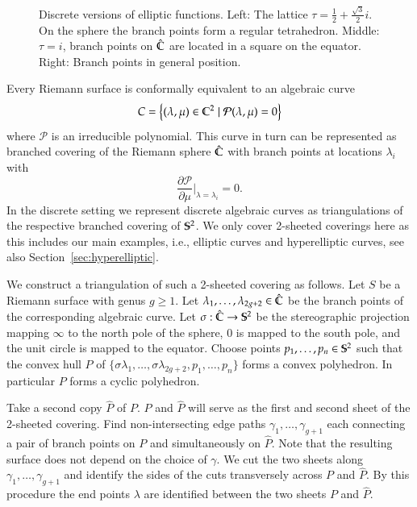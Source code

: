 \documentclass[Thesis]{subfiles}
\begin{document}
\begin{figure}
\centering
{}
\caption{Discrete versions of elliptic functions. Left: The lattice $\tau=\frac{1}{2}+\frac{\sqrt 3}{2}i$. On the sphere the branch points form a regular tetrahedron. Middle: $\tau=i$, branch points on $\hat \C$ are located in a square on the equator. Right: Branch points in general position.}
\label{fig:p_functions}
\end{figure}

Every Riemann surface is conformally equivalent to an algebraic curve
\[C=\left\{(\lambda,\mu)\in \C^2 \mid \mathcal P(\lambda,\mu)=0\right\}\]
where $\mathcal P$ is an irreducible polynomial.
This curve in turn can be represented as branched covering of the Riemann sphere $\hat{\C}$ with branch points at locations $\lambda_i$ with \[\frac{\partial\mathcal P}{\partial \mu}\Bigr|_{\lambda=\lambda_i} = 0.\]
In the discrete setting we represent discrete algebraic curves as triangulations of the respective branched covering of $\S^2$.
We only cover 2-sheeted coverings here as this includes our main examples, i.e., elliptic curves and hyperelliptic curves, see also Section~\ref{sec:hyperelliptic}.

We construct a triangulation of such a 2-sheeted covering as follows.
Let $S$ be a Riemann surface with genus $g\geq 1$.
Let $\lambda_1,\ldots,\lambda_{2g+2}\in \hat\C$ be the branch points of the corresponding algebraic curve.
Let $\sigma :\hat\C\to\S^2$ be the stereographic projection mapping $\infty$ to the north pole of the sphere, $0$ is mapped to the south pole, and the unit circle is mapped to the equator.
Choose points $p_1,\ldots,p_n\in\S^2$ such that the convex hull $P$ of $\{\sigma\lambda_1,\ldots,\sigma\lambda_{2g+2},p_1,\ldots,p_n\}$ forms a convex polyhedron.
In particular $P$ forms a cyclic polyhedron.

Take a second copy $\hat P$ of $P$. $P$ and $\hat P$ will serve as the first and second sheet of the 2-sheeted covering.
Find non-intersecting edge paths $\gamma_1,\ldots,\gamma_{g+1}$ each connecting a pair of branch points on $P$ and simultaneously on $\hat P$.
Note that the resulting surface does not depend on the choice of $\gamma$.
We cut the two sheets along $\gamma_1,\ldots,\gamma_{g+1}$ and identify the sides of the cuts transversely across $P$ and $\hat P$.
By this procedure the end points $\lambda$ are identified between the two sheets $P$ and $\hat P$.
\end{document}
